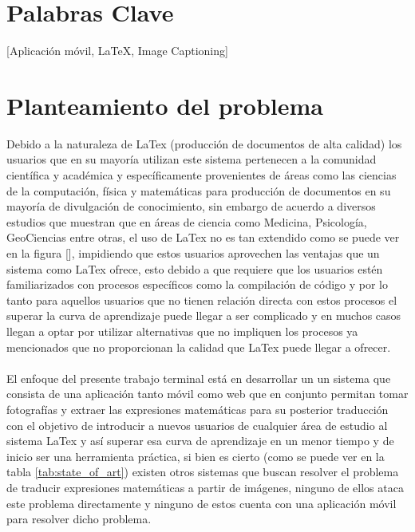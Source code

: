 \section{Palabras Clave}
[Aplicación móvil, LaTeX, Image Captioning] %
\section{Planteamiento del problema}


 Debido a la naturaleza de LaTex (producción de documentos de alta calidad) los usuarios que en su mayoría utilizan este sistema pertenecen a la comunidad científica y académica y específicamente provenientes de áreas como las ciencias de la computación, física y matemáticas para producción de documentos en su mayoría de divulgación de conocimiento, sin embargo de acuerdo a diversos estudios \cite{latexUsage} que muestran que en áreas de ciencia como Medicina, Psicología, GeoCiencias entre otras, el uso de LaTex no es tan extendido como se puede ver en la figura [], impidiendo que estos usuarios aprovechen las ventajas que un sistema como LaTex ofrece, esto debido a que requiere que los usuarios estén familiarizados con procesos específicos como la compilación de código y por lo tanto para aquellos usuarios que no tienen relación directa con estos procesos el superar la curva de aprendizaje puede llegar a ser complicado y en muchos casos llegan a optar por utilizar alternativas que no impliquen los procesos ya mencionados que no proporcionan la calidad que LaTex puede llegar a ofrecer.
\\\\%

El enfoque del presente trabajo terminal está en desarrollar un un sistema que consista de una aplicación tanto móvil como web que en conjunto permitan tomar fotografías y extraer las expresiones matemáticas para su posterior traducción con el objetivo de introducir a nuevos usuarios de cualquier área de estudio al sistema LaTex y así superar esa curva de aprendizaje en un menor tiempo y de inicio ser una herramienta práctica, si bien es cierto (como se puede ver en la tabla																							 \ref{tab:state_of_art}) existen otros sistemas que buscan resolver el problema de traducir expresiones matemáticas a partir de imágenes, ninguno de ellos ataca este problema directamente y ninguno de estos cuenta con una aplicación móvil para resolver dicho problema.
\\\\%

